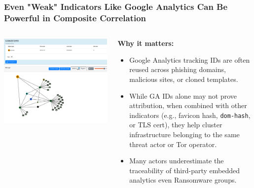 \documentclass[10pt,aspectratio=169, colorlinks=true, linkcolor=circlBlue]{beamer}
\begin{document}
\begin{frame}
    \frametitle{Even "Weak" Indicators Like Google Analytics Can Be Powerful in Composite Correlation}
    \begin{columns}
        \begin{column}{0.50\textwidth}
            \includegraphics[scale=0.16]{./img/gtracker-2.png}
        \end{column}
        \begin{column}{0.50\textwidth}
            \small
            \textbf{Why it matters:}
            \begin{itemize}
                \item Google Analytics tracking IDs are often reused across phishing domains, malicious sites, or cloned templates.
		\item While GA IDs alone may not prove attribution, when combined with other indicators (e.g., favicon hash, \texttt{dom-hash}, or TLS cert), they help cluster infrastructure belonging to the same threat actor or Tor operator.
                \item Many actors underestimate the traceability of third-party embedded analytics even Ransomware groups.
            \end{itemize}
        \end{column}
    \end{columns}
\end{frame}
\end{document}
